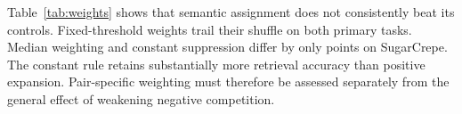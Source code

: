 
Table~\ref{tab:weights} shows that semantic assignment does not consistently beat its controls. Fixed-threshold weights trail their shuffle on both primary tasks. Median weighting and constant suppression differ by only \MedianConstantSugarGap{} points on SugarCrepe. The constant rule retains substantially more retrieval accuracy than positive expansion. Pair-specific weighting must therefore be assessed separately from the general effect of weakening negative competition.
